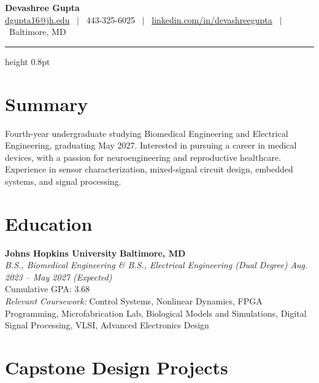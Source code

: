 \documentclass[10.5pt,letterpaper]{article}
\newcommand{\entry}[4]{%
  \noindent\textbf{#1} \hfill \textbf{#3}\\
  \noindent\textit{#2} \hfill \textit{#4}\\[-0.15em]
}
\begin{document}
\begin{center}
  {\Huge \textbf{Devashree Gupta}}\\[0.45em]
  {\small
    \href{mailto:dgupta16@jh.edu}{dgupta16@jh.edu} \ $\vert$ \
    443-325-6025 \ $\vert$ \
    \href{https://linkedin.com/in/devashreegupta}{linkedin.com/in/devashreegupta} \ $\vert$ \
    Baltimore, MD
  }
\end{center}
\vspace{-0.3em}
{\color{hairline}\hrule height 0.8pt}
\vspace{0.6em}

\section*{Summary}
Fourth-year undergraduate studying Biomedical Engineering and Electrical Engineering, graduating May 2027. Interested in pursuing a career in medical devices, with a passion for neuroengineering and reproductive healthcare. Experience in sensor characterization, mixed-signal circuit design, embedded systems, and signal processing.

\section{Education}
\entry{Johns Hopkins University}{B.S., Biomedical Engineering \& B.S., Electrical Engineering (Dual Degree)}{Baltimore, MD}{Aug. 2023 -- May 2027 (Expected)}
Cumulative GPA: 3.68\\
\textit{Relevant Coursework:} Control Systems, Nonlinear Dynamics, FPGA Programming, Microfabrication Lab, Biological Models and Simulations, Digital Signal Processing, VLSI, Advanced Electronics Design

\section{Capstone Design Projects}
\end{document}
